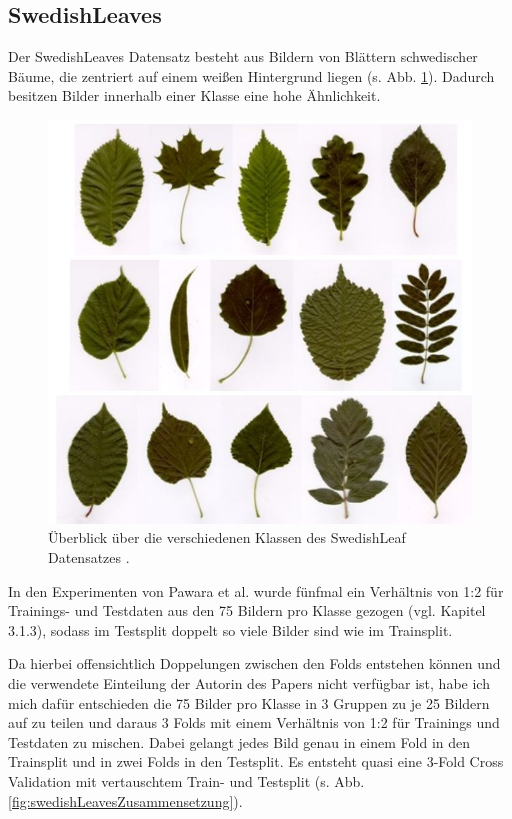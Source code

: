 \subsection{SwedishLeaves}
\label{ch:methodik_SwedishLeaves}
Der SwedishLeaves Datensatz \cite{swedishLeaves} besteht aus Bildern von Blättern schwedischer Bäume, die zentriert auf einem weißen Hintergrund liegen (s. Abb. \ref{fig:swedishLeavesUeberblick}). Dadurch besitzen Bilder innerhalb einer Klasse eine hohe Ähnlichkeit.

\begin{figure}[H]
\centering
\includegraphics[scale=0.8]{img/2_swedishLeaves-image.jpg}
\caption{Überblick über die verschiedenen Klassen des SwedishLeaf Datensatzes \cite{pawaraMonkey}.}
\label{fig:swedishLeavesUeberblick}
\end{figure}

In den Experimenten von Pawara et al. \cite{pawaraPaper} wurde fünfmal ein Verhältnis von 1:2 für Trainings- und Testdaten aus den 75 Bildern pro Klasse gezogen (vgl. \cite{pawaraPaper} Kapitel 3.1.3), sodass im Testsplit doppelt so viele Bilder sind wie im Trainsplit.

Da hierbei offensichtlich Doppelungen zwischen den Folds entstehen können und die verwendete Einteilung der Autorin des Papers \cite{pawaraPaper} nicht verfügbar ist, habe ich mich dafür entschieden die 75 Bilder pro Klasse in 3 Gruppen zu je 25 Bildern auf zu teilen und daraus 3 Folds mit einem Verhältnis von 1:2 für Trainings und Testdaten zu mischen. Dabei gelangt jedes Bild genau in einem Fold in den Trainsplit und in zwei Folds in den Testsplit. Es entsteht quasi eine 3-Fold Cross Validation mit vertauschtem Train- und Testsplit (s. Abb. \ref{fig:swedishLeavesZusammensetzung}).

